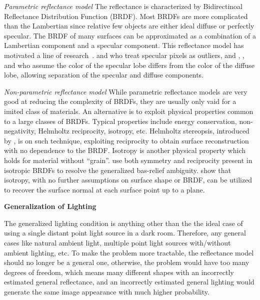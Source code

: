 \textit{Parametric reflectance model} The reflectance is characterized by Bidirectinoal Reflectance Distribution Function (BRDF). Most BRDFs are more complicated than the Lambertian since relative few objects are either ideal diffuse or perfectly specular. The BRDF of many surfaces can be approximated as a combination of a Lambertian component and a specular component. This reflectance model has motivated a line of research~\cite{barsky20034,coleman1982obtaining,nayar1990determining}. \citeauthor{coleman1982obtaining} and \citeauthor{barsky20034} who treat specular pixels as outliers, and \citeauthor{schluns1993photometric}, \citeauthor{sato1994temporal}, and \citeauthor{mallick2005beyond} who assume the color of the specular lobe differs from the color of the diffuse lobe, allowing separation of the specular and diffuse components.

\textit{Non-parametric reflectance model} While parametric reflectance models are very good at reducing the complexity of BRDFs, they are usually only vaid for a imited class of materials. An alternative is to exploit physical properties common to a large classes of BRDFs. Typical properties include energy conservation, non-negativity, Helmholtz reciprocity, isotropy, etc. Helmholtz stereopsis, introduced by \citeauthor{zickler2002helmholtz}, is on such technique, exploiting reciprocity to obtain surface reconstruction with no dependence to the BRDF. Isotropy is another physical property which holds for material without ``grain''. \citeauthor{tan2007isotropy} use both symmetry and reciprocity present in isotropic BRDFs to resolve the generalized bas-relief ambiguity. \citeauthor{alldrin2007toward} show that isotropy, with no further assumptions on surface shape or BRDF, can be utilized to recover the surface normal at each surface point up to a plane.

\textbf{Generalization of Lighting}

The generalized lighting condition is anything other than the the ideal case of using a single distant point light source in a dark room. Therefore, any general cases like natural ambient light, multiple point light sources with/without ambient lighting, etc. To make the problem more tractable, the reflectance model should no longer be a general one, otherwise, the problem would have too many degrees of freedom, which means many different shapes with an incorrectly estimated general reflectance, and an incorrectly estimated general lighting would generate the same image appearance with much higher probability.

